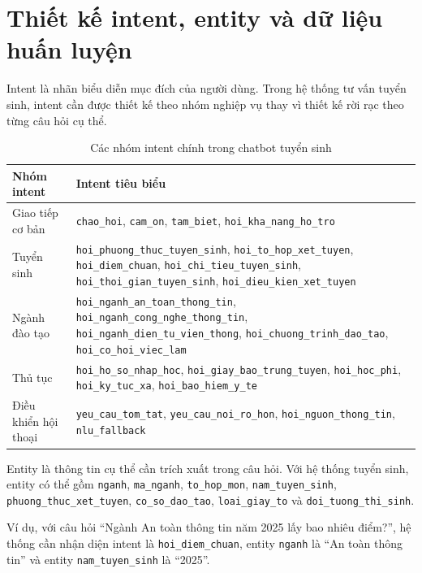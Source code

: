\documentclass[12pt,a4paper]{report}
\begin{document}
\section{Thiết kế intent, entity và dữ liệu huấn luyện}

Intent là nhãn biểu diễn mục đích của người dùng. Trong hệ thống tư vấn tuyển sinh, intent cần được thiết kế theo nhóm nghiệp vụ thay vì thiết kế rời rạc theo từng câu hỏi cụ thể.

\begin{table}[H]
\centering
\begin{tabular}{|p{4cm}|p{8.5cm}|}
\hline
\textbf{Nhóm intent} & \textbf{Intent tiêu biểu} \\
\hline
Giao tiếp cơ bản & \texttt{chao\_hoi}, \texttt{cam\_on}, \texttt{tam\_biet}, \texttt{hoi\_kha\_nang\_ho\_tro} \\
\hline
Tuyển sinh & \texttt{hoi\_phuong\_thuc\_tuyen\_sinh}, \texttt{hoi\_to\_hop\_xet\_tuyen}, \texttt{hoi\_diem\_chuan}, \texttt{hoi\_chi\_tieu\_tuyen\_sinh}, \texttt{hoi\_thoi\_gian\_tuyen\_sinh}, \texttt{hoi\_dieu\_kien\_xet\_tuyen} \\
\hline
Ngành đào tạo & \texttt{hoi\_nganh\_an\_toan\_thong\_tin}, \texttt{hoi\_nganh\_cong\_nghe\_thong\_tin}, \texttt{hoi\_nganh\_dien\_tu\_vien\_thong}, \texttt{hoi\_chuong\_trinh\_dao\_tao}, \texttt{hoi\_co\_hoi\_viec\_lam} \\
\hline
Thủ tục & \texttt{hoi\_ho\_so\_nhap\_hoc}, \texttt{hoi\_giay\_bao\_trung\_tuyen}, \texttt{hoi\_hoc\_phi}, \texttt{hoi\_ky\_tuc\_xa}, \texttt{hoi\_bao\_hiem\_y\_te} \\
\hline
Điều khiển hội thoại & \texttt{yeu\_cau\_tom\_tat}, \texttt{yeu\_cau\_noi\_ro\_hon}, \texttt{hoi\_nguon\_thong\_tin}, \texttt{nlu\_fallback} \\
\hline
\end{tabular}
\caption{Các nhóm intent chính trong chatbot tuyển sinh}
\label{tab:rasa-intent-groups}
\end{table}

Entity là thông tin cụ thể cần trích xuất trong câu hỏi. Với hệ thống tuyển sinh, entity có thể gồm \texttt{nganh}, \texttt{ma\_nganh}, \texttt{to\_hop\_mon}, \texttt{nam\_tuyen\_sinh}, \texttt{phuong\_thuc\_xet\_tuyen}, \texttt{co\_so\_dao\_tao}, \texttt{loai\_giay\_to} và \texttt{doi\_tuong\_thi\_sinh}.

Ví dụ, với câu hỏi ``Ngành An toàn thông tin năm 2025 lấy bao nhiêu điểm?'', hệ thống cần nhận diện intent là \texttt{hoi\_diem\_chuan}, entity \texttt{nganh} là ``An toàn thông tin'' và entity \texttt{nam\_tuyen\_sinh} là ``2025''.
\end{document}
